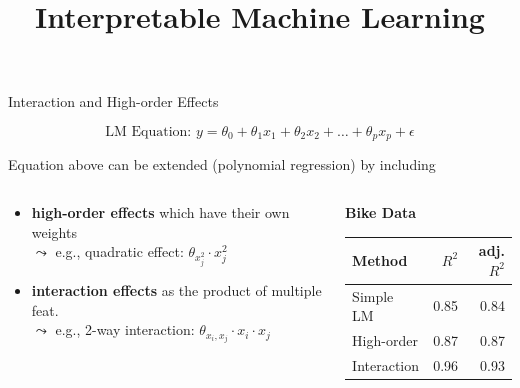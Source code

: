 \documentclass[10pt,compress,t,notes=noshow, xcolor=table]{beamer}
\title{Interpretable Machine Learning}
\date{}
\begin{document}


\begin{frame}{Interaction and High-order Effects}

$$\text{LM Equation: } y = \theta_0 + \theta_1 x_1 + \theta_2 x_2 + \dots + \theta_p x_p + \epsilon$$

Equation above can be extended (polynomial regression) by including

\begin{columns}[T, totalwidth=\textwidth]
\begin{column}{0.7\linewidth}
    \begin{itemize}
        \item \textbf{high-order effects} which have their own weights\\
        $\leadsto$ e.g., quadratic effect: $\theta_{x_j^2} \cdot x_j^2$
        \item \textbf{interaction effects} as the product of multiple feat.\\
        $\leadsto$ e.g., 2-way interaction: $\theta_{x_i, x_j} \cdot x_i \cdot x_j$
    \end{itemize}
\end{column}
\begin{column}{0.3\linewidth}
    \vspace{-0.2cm}
    \centering
    \begin{scriptsize}
    \begin{table}[ht]
    \textbf{Bike Data}
        \begin{tabular}{lrr}
        \hline
        Method & $R^2$ & adj. $R^2$ \\ 
        \hline
        Simple LM & 0.85 & 0.84 \\ 
        High-order & 0.87 & 0.87 \\ 
        Interaction  & 0.96 & 0.93 \\ 
        \hline
        \end{tabular}
    \end{table}
    \end{scriptsize}
\end{column}
\end{columns}


\end{frame}
\end{document}
